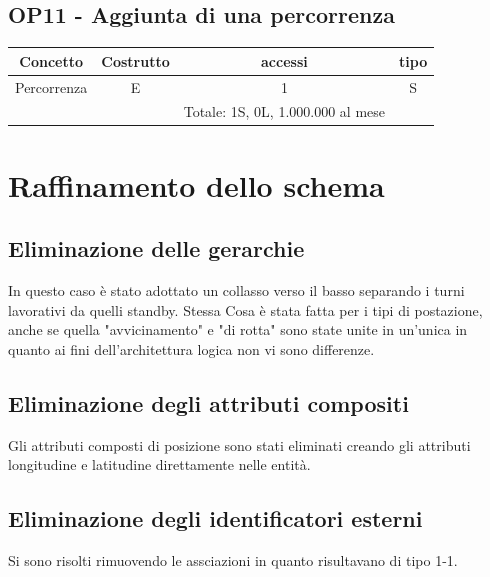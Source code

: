     \subsection*{OP11 - Aggiunta di una percorrenza}
    \begin{table}[H]
    \centering
    \begin{tabular}{|c|c|c|c|}
    \hline
    \rowcolor{green!70!black!80}
    \textbf{Concetto} & \textbf{Costrutto} & \textbf{accessi} & \textbf{tipo}\\
    \hline
    Percorrenza & E & 1 & S \\\
    & & Totale: 1S, 0L, 1.000.000 al mese &\\
    \hline
    \end{tabular}
    \end{table}
  
\section{Raffinamento dello schema}
\subsection*{Eliminazione delle gerarchie}
In questo caso è stato adottato un collasso verso il basso separando i turni lavorativi da quelli standby. 
Stessa Cosa è stata fatta per i tipi di postazione, anche se quella "avvicinamento" e "di rotta" sono state unite in un'unica in quanto ai fini dell'architettura logica non vi sono differenze.


\subsection*{Eliminazione degli attributi compositi}
Gli attributi composti di posizione sono stati eliminati creando gli attributi longitudine e latitudine direttamente nelle entità.
\subsection*{Eliminazione degli identificatori esterni}
Si sono risolti rimuovendo le assciazioni in quanto risultavano di tipo 1-1.
